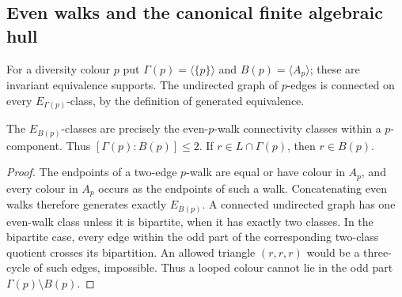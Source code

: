 \subsection{Even walks and the canonical finite algebraic hull}

For a diversity colour $p$ put $\Gamma(p)=\langle\{p\}\rangle$ and
$B(p)=\langle A_p\rangle$; these are invariant equivalence supports.
The undirected graph of $p$-edges is connected on every
$E_{\Gamma(p)}$-class, by the definition of generated equivalence.

\begin{lemma}\label{lem:rh-evenwalk}
The $E_{B(p)}$-classes are precisely the even-$p$-walk connectivity
classes within a $p$-component. Thus
$[\Gamma(p):B(p)]\le2$. If $r\in L\cap\Gamma(p)$, then
$r\in B(p)$.
\end{lemma}
\begin{proof}
The endpoints of a two-edge $p$-walk are equal or have colour in
$A_p$, and every colour in $A_p$ occurs as the endpoints of such a
walk. Concatenating even walks therefore generates exactly
$E_{B(p)}$. A connected undirected graph has one even-walk class
unless it is bipartite, when it has exactly two classes.
In the bipartite case, every edge within the odd part of the
corresponding two-class quotient crosses its bipartition. An allowed
triangle $(r,r,r)$ would be a three-cycle of such edges, impossible.
Thus a looped colour cannot lie in the odd part
$\Gamma(p)\setminus B(p)$.
\end{proof}

